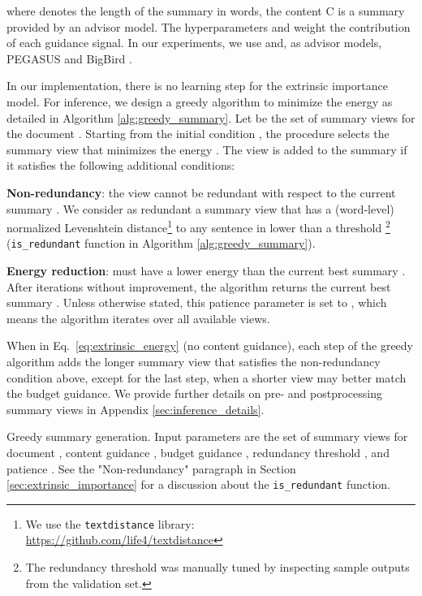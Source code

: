 \documentclass[11pt,table]{article}
\newenvironment{itemizesquish}[2]{\begin{list}{\labelitemi}{\setlength{\itemsep}{#1}\setlength{\labelwidth}{#2}\setlength{\leftmargin}{\labelwidth}\addtolength{\leftmargin}{\labelsep}}}{\end{list}}
\begin{document}
where  denotes the length of the summary in words, the content C is a summary provided by an advisor model. The hyperparameters  and  weight the contribution of each guidance signal. In our experiments, we use  and, as advisor models, PEGASUS \citep{zhang2020pegasus} and BigBird \citep{zaheer2020big}.

In our implementation, there is no learning step for the extrinsic importance model. For inference, we design a greedy algorithm to minimize the energy as detailed in Algorithm \ref{alg:greedy_summary}. Let  be the set of  summary views for the document . Starting from the initial condition , the procedure selects the summary view  that minimizes the energy . The view  is added to the summary if it satisfies the following additional conditions:
\begin{itemizesquish}{-0.3em}{0.5em}
    \item \textbf{Non-redundancy}: the view  cannot be redundant with respect to the current summary . We consider as redundant a summary view that has a (word-level) normalized Levenshtein distance\footnote{We use the \texttt{textdistance} library:\\ \url{https://github.com/life4/textdistance}} \citep{levenshtein1966binary} to any sentence in  lower than a threshold \footnote{The redundancy threshold was manually tuned by inspecting sample outputs from the validation set.} (\texttt{is\_redundant} function in Algorithm \ref{alg:greedy_summary}).
    \item \textbf{Energy reduction}:  must have a lower energy than the current best summary . After  iterations without improvement, the algorithm returns the current best summary . Unless otherwise stated, this patience parameter is set to , which means the algorithm iterates over all available views.
\end{itemizesquish}
When  in Eq.~\ref{eq:extrinsic_energy} (no content guidance), each step of the greedy algorithm adds the longer summary view that satisfies the non-redundancy condition above, except for the last step, when a shorter 
view may better match the budget guidance. We provide further details on pre- and postprocessing summary views in Appendix \ref{sec:inference_details}.
\DecMargin{2em}
\begin{algorithm}[t]
    \hfill
    \begin{minipage}{0.87\linewidth}
    \small
    \SetAlgoLined
    \KwIn{}
    \KwOut{} 
    \;
    \;
    \While{}{
        
    
        \uIf{}{
            \;
            \;
        } \uElseIf{} {
            \;
            \;
            \;
        }
        \;
    }
    \end{minipage}

    \caption{Greedy summary generation. Input parameters are the set of summary views  for document , content guidance , budget guidance , redundancy threshold , and patience . See the "Non-redundancy" paragraph in Section \ref{sec:extrinsic_importance} for a discussion about the \texttt{is\_redundant} function.}\label{alg:greedy_summary}
\end{algorithm}
\end{document}

